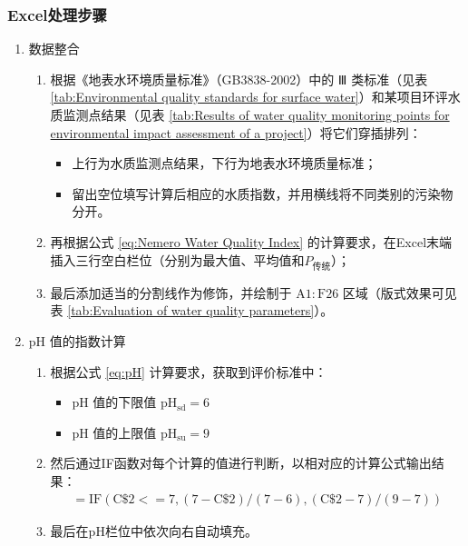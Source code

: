 \subsubsection{Excel处理步骤}
\begin{enumerate}
    \item 数据整合
    \begin{enumerate}[label=(\arabic*)]
        \item 根据《地表水环境质量标准》（GB3838-2002）中的 Ⅲ 类标准（见表 \ref{tab:Environmental quality standards for surface water}）和某项目环评水质监测点结果（见表 \ref{tab:Results of water quality monitoring points for environmental impact assessment of a project}）将它们穿插排列：
        \begin{itemize}
            \item 上行为水质监测点结果，下行为地表水环境质量标准；
            \item 留出空位填写计算后相应的水质指数，并用横线将不同类别的污染物分开。
        \end{itemize}
        \item 再根据公式 \ref{eq:Nemero Water Quality Index} 的计算要求，在Excel末端插入三行空白栏位（分别为最大值、平均值和$P_{\text{传统}}$）；
        \item 最后添加适当的分割线作为修饰，并绘制于 $\mathrm{A1:F26}$ 区域（版式效果可见表 \ref{tab:Evaluation of water quality parameters}）。
    \end{enumerate}

    \item pH 值的指数计算
    \begin{enumerate}[label=(\arabic*)]
        \item 根据公式 \ref{eq:pH} 计算要求，获取到评价标准中：
        \begin{itemize}
            \item pH 值的下限值 $\mathrm{pH_{sd}}=6$
            \item pH 值的上限值 $\mathrm{pH_{su}}=9$
        \end{itemize}
        \item 然后通过IF函数对每个计算的值进行判断，以相对应的计算公式输出结果：
        \begin{align*}
            \mathrm{=IF(C\$2<=7,(7-C\$2)/(7-6),(C\$2-7)/(9-7))}
        \end{align*}
        \item 最后在pH栏位中依次向右自动填充。
    \end{enumerate}
    

\end{enumerate}
